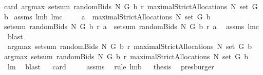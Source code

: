 \begin{isabellebody}
{\isachardoublequoteopen}{}{\isacharequal}card\ {\isacharparenleft}argmax\ {\isacharparenleft}setsum\ {\isacharparenleft}randomBids\ N\ G\ b\ r{\isacharparenright}{\isacharparenright}\ {\isacharparenleft}maximalStrictAllocations{\isacharprime}\ N\ {\isacharparenleft}set\ G{\isacharparenright}\ b{\isacharparenright}{\isacharparenright}{\isachardoublequoteclose}\isanewline
%
\isadelimproof
%
\endisadelimproof
%
\isatagproof
{}\isamarkupfalse%
\ assms\ lm{}{}b\ lm{}{}c\ \isanewline
{}\isamarkupfalse%
\ {\isacharminus}\isanewline
{}\isamarkupfalse%
\ {\isachardoublequoteopen}{\isasymforall}\ a\ {\isasymin}\ maximalStrictAllocations{\isacharprime}\ N\ {\isacharparenleft}set\ G{\isacharparenright}\ b{\isachardot}\ \isanewline
setsum\ {\isacharparenleft}randomBids{\isacharprime}\ N\ G\ b\ r{\isacharparenright}\ a\ {\isacharequal}\ setsum\ {\isacharparenleft}randomBids\ N\ G\ b\ r{\isacharparenright}\ a{\isachardoublequoteclose}\ \isamarkupfalse%
\ assms{\isacharparenleft}{}{\isacharcomma}{}{\isacharparenright}\ lm{}{}c\ \isamarkupfalse%
\ blast\isanewline
{}\isamarkupfalse%
\ \isamarkupfalse%
\ {\isachardoublequoteopen}argmax\ {\isacharparenleft}setsum\ {\isacharparenleft}randomBids\ N\ G\ b\ r{\isacharparenright}{\isacharparenright}\ {\isacharparenleft}maximalStrictAllocations{\isacharprime}\ N\ {\isacharparenleft}set\ G{\isacharparenright}\ b{\isacharparenright}\ {\isacharequal}\isanewline
argmax\ {\isacharparenleft}setsum\ {\isacharparenleft}randomBids{\isacharprime}\ N\ G\ b\ r{\isacharparenright}{\isacharparenright}\ {\isacharparenleft}maximalStrictAllocations{\isacharprime}\ N\ {\isacharparenleft}set\ G{\isacharparenright}\ b{\isacharparenright}{\isachardoublequoteclose}\ \isamarkupfalse%
\ lm{}{}\ \isamarkupfalse%
\ blast\isanewline
{}\isamarkupfalse%
\ \isamarkupfalse%
\ {\isachardoublequoteopen}card\ {\isachardot}{\isachardot}{\isachardot}\ {\isacharequal}\ {}{\isachardoublequoteclose}\ \isamarkupfalse%
\ assms\ \isamarkupfalse%
\ {\isacharparenleft}rule\ lm{}{}b{\isacharparenright}\isanewline
{}\isamarkupfalse%
\ \isamarkupfalse%
\ {\isacharquery}thesis\ \isamarkupfalse%
\ presburger\isanewline
{}\isamarkupfalse%

\end{isabellebody}
